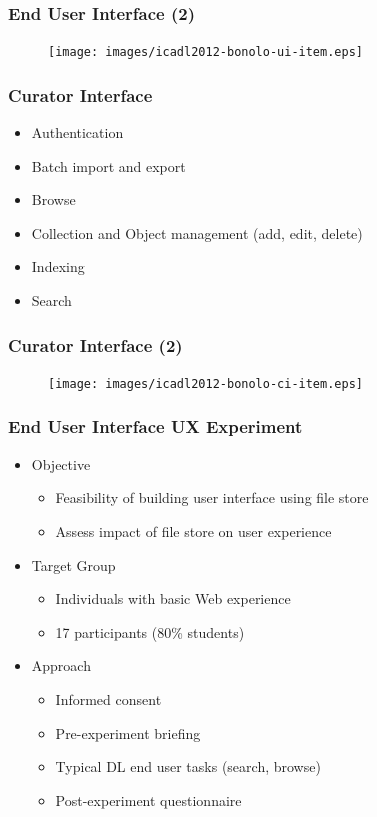 \documentclass[xcolor=dvitex,t,11pt]{beamer}
\begin{document}
\begin{frame}[fragile]
\frametitle{End User Interface (2)}
\begin{figure}
\centering
\texttt{[image: images/icadl2012-bonolo-ui-item.eps]}
\end{figure}
\end{frame}

\begin{frame}[fragile]
\frametitle{Curator Interface}
\begin{figure}
\centering

\end{figure}
\begin{itemize}
\item Authentication
\item Batch import and export
\item Browse
\item Collection and Object management (add, edit, delete)
\item Indexing
\item Search
\end{itemize}
\end{frame}

\begin{frame}[fragile]
\frametitle{Curator Interface (2)}
\begin{figure}
\centering
\texttt{[image: images/icadl2012-bonolo-ci-item.eps]}
\end{figure}
\end{frame}

\begin{frame}[fragile]
\frametitle{End User Interface UX Experiment}
\begin{itemize}
\item Objective
\begin{itemize}
\item Feasibility of building user interface using file store
\item Assess impact of file store on user experience
\end{itemize}
\item Target Group
\begin{itemize}
\item Individuals with basic Web experience
\item 17 participants (80\% students)
\end{itemize}
\item Approach
\begin{itemize}
\item Informed consent
\item Pre-experiment briefing
\item Typical DL end user tasks (search, browse)
\item Post-experiment questionnaire
\end{itemize}
\end{itemize}
\end{frame}
\end{document}
